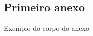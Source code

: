 %
%

\begin{anexosenv}

\chapter{Primeiro anexo}
\label{anexo:anexo1}
Exemplo do corpo do anexo

\end{anexosenv}